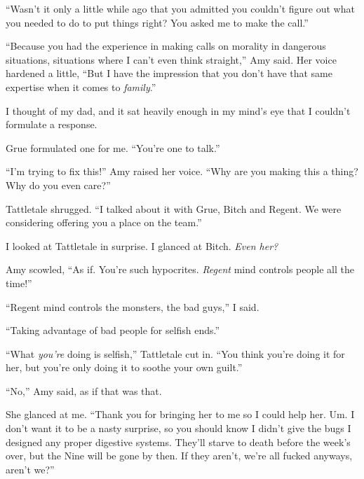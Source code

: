 ``Wasn't it only a little while ago that you admitted you couldn't figure out what you needed to do to put things right?  You asked me to make the call.''



``Because you had the experience in making calls on morality in dangerous situations, situations where I can't even think straight,'' Amy said.  Her voice hardened a little, ``But I have the impression that you don't have that same expertise when it comes to \emph{family}.''



I thought of my dad, and it sat heavily enough in my mind's eye that I couldn't formulate a response.



Grue formulated one for me.  ``You're one to talk.''



``I'm trying to fix this!''  Amy raised her voice.  ``Why are you making this a thing?  Why do you even care?''



Tattletale shrugged.  ``I talked about it with Grue, Bitch and Regent.  We were considering offering you a place on the team.''



I looked at Tattletale in surprise.  I glanced at Bitch.  \emph{Even her?}



Amy scowled, ``As if.  You're such hypocrites.\emph{  Regent} mind controls people all the time!''



``Regent mind controls the monsters, the bad guys,'' I said.



``Taking advantage of bad people for selfish ends.''



``What \emph{you're} doing is selfish,'' Tattletale cut in.  ``You think you're doing it for her, but you're only doing it to soothe your own guilt.''



``No,'' Amy said, as if that was that.



She glanced at me.  ``Thank you for bringing her to me so I could help her.  Um.  I don't want it to be a nasty surprise, so you should know I didn't give the bugs I designed any proper digestive systems.  They'll starve to death before the week's over, but the Nine will be gone by then.  If they aren't, we're all fucked anyways, aren't we?''



